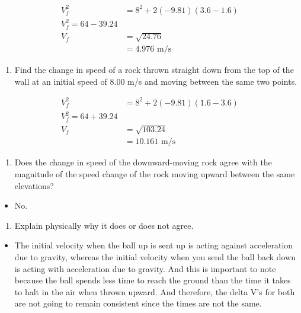 \documentclass[
  letterpaper,
  DIV=11,
  numbers=noendperiod]{scrartcl}
\providecommand{\tightlist}{%
  \setlength{\itemsep}{0pt}\setlength{\parskip}{0pt}}\usepackage{longtable,booktabs,array}
\begin{document}
\begin{align*}
  V_f^2 &= 8^2 + 2(-9.81)(3.6-1.6) \\
  V_f^2 = 64 - 39.24 \\
  V_f &= \sqrt{24.76} \\
  &= 4.976 \text{ m/s}
  \end{align*}

\begin{enumerate}
\def\labelenumi{(\alph{enumi})}
\setcounter{enumi}{2}
\tightlist
\item
  Find the change in speed of a rock thrown straight down from the top
  of the wall at an initial speed of \(8.00\) m/s and moving between the
  same two points.
\end{enumerate}

\begin{align*}
  V_f^2 &= 8^2 + 2(-9.81)(1.6-3.6) \\
  V_f^2 = 64 + 39.24 \\
  V_f &= \sqrt{103.24} \\
  &= 10.161 \text{ m/s}
  \end{align*}

\begin{enumerate}
\def\labelenumi{(\alph{enumi})}
\setcounter{enumi}{3}
\tightlist
\item
  Does the change in speed of the downward-moving rock agree with the
  magnitude of the speed change of the rock moving upward between the
  same elevations?
\end{enumerate}

\begin{itemize}
\tightlist
\item
  No.
\end{itemize}

\begin{enumerate}
\def\labelenumi{(\alph{enumi})}
\setcounter{enumi}{4}
\tightlist
\item
  Explain physically why it does or does not agree.
\end{enumerate}

\begin{itemize}
\tightlist
\item
  The initial velocity when the ball up is sent up is acting against
  acceleration due to gravity, whereas the initial velocity when you
  send the ball back down is acting with acceleration due to gravity.
  And this is important to note because the ball spends less time to
  reach the ground than the time it takes to halt in the air when thrown
  upward. And therefore, the delta V's for both are not going to remain
  consistent since the times are not the same.
\end{itemize}
\end{document}
